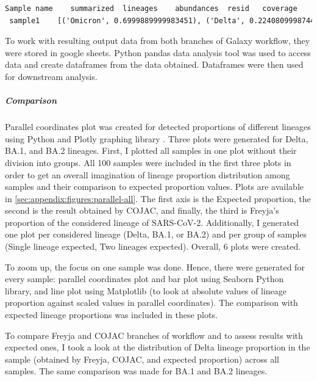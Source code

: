                 \begin{lstlisting}[language=xml, caption=Freyja output for sample 1 from mock dataset, label=list:methods:freyja-s1]
 Sample name	summarized	lineages	abundances	resid	coverage
 sample1 	[('Omicron', 0.6999889999983451), ('Delta', 0.22408099987442534), ('Other', 0.07552100018490182)]	BA.1.18 AY.4 BA.1.19 BA.1.1.13 BA.1.15.1 AY.38 BA.1.9 BA.1.16 B B.1.617.2 B.1.1.529 XS	0.23943700 0.11764700 0.11363600 0.10000000 0.09667000 0.06944400 0.06686400 0.06474800 0.06122400 0.03699000 0.01863400 0.01429700	7.611495978	99.95971667
                \end{lstlisting}
                
                To work with resulting output data from both branches of Galaxy workflow, they were stored in google sheets. Python pandas data analysis tool \cite{pandas2022} was used to access data and create dataframes from the data obtained. Dataframes were then used for downstream analysis.

                \subparagraph{Comparison}
                Parallel coordinates plot was created for detected proportions of different lineages using Python and Plotly graphing library \cite{plotly}. Three plots were generated for Delta, BA.1, and BA.2 lineages. First, I plotted all samples in one plot without their division into groups. All 100 samples were included in the first three plots in order to get an overall imagination of lineage proportion distribution among samples and their comparison to expected proportion values. Plots are available in \cref{sec:appendix:figures:parallel-all}. The first axis is the Expected proportion, the second is the result obtained by COJAC, and finally, the third is Freyja’s proportion of the considered lineage of SARS-CoV-2. Additionally, I generated one plot per considered lineage (Delta, BA.1, or BA.2) and per group of samples (Single lineage expected, Two lineages expected). Overall, 6 plots were created. 

                To zoom up, the focus on one sample was done. Hence, there were generated for every sample: parallel coordinates plot and bar plot using Seaborn Python library, and line plot using Matplotlib (to look at absolute values of lineage proportion against scaled values in parallel coordinates). The comparison with expected lineage proportions was included in these plots.
                
                To compare Freyja and COJAC branches of workflow and to assess results with expected ones, I took a look at the distribution of Delta lineage proportion in the sample (obtained by Freyja, COJAC, and expected proportion) across all samples. The same comparison was made for BA.1 and BA.2 lineages.
                
